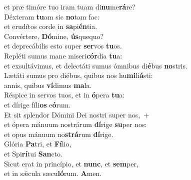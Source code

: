 \oddverse et præ timóre tuo iram tuam di\textbf{nu}me\textbf{rá}re?\\
\evenverse Déxteram \textbf{tu}am sic \textbf{no}tam fac:~\*\\
\evenverse et erudítos corde in \textbf{sa}pi\textbf{én}tia.\\
\oddverse Convértere, \textbf{Dó}mine, \textbf{ús}quequo?~\*\\
\oddverse et deprecábilis esto super \textbf{ser}vos \textbf{tu}os.\\
\evenverse Repléti sumus mane miseri\textbf{cór}dia \textbf{tu}a:~\*\\
\evenverse et exsultávimus, et delectáti sumus ómnibus di\textbf{é}bus \textbf{no}stris.\\
\oddverse Lætáti sumus pro diébus, quibus nos hu\textbf{mi}li\textbf{á}sti:~\*\\
\oddverse annis, quibus \textbf{ví}dimus \textbf{ma}la.\\
\evenverse Réspice in servos tuos, et in \textbf{ó}pera \textbf{tu}a:~\*\\
\evenverse et dírige fíli\textbf{os} e\textbf{ó}rum.\\
\oddverse Et sit splendor Dómini Dei nostri super nos,~+\\
\oddverse  et ópera mánuum nostrárum \textbf{dí}rige \textbf{su}per nos:~\*\\
\oddverse et opus mánuum no\textbf{strá}rum \textbf{dí}rige.\\
\evenverse Glória \textbf{Pa}tri, et \textbf{Fí}lio,~\*\\
\evenverse et Spi\textbf{rí}tui \textbf{San}cto.\\
\oddverse Sicut erat in princípio, et \textbf{nunc}, et \textbf{sem}per,~\*\\
\oddverse et in sǽcula sæcu\textbf{ló}rum. \textbf{A}men.\\
